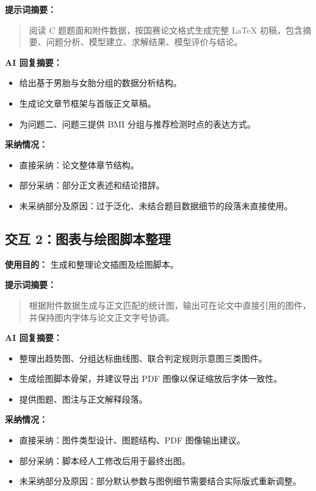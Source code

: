 \documentclass[12pt,a4paper]{article}
\begin{document}
\textbf{提示词摘要：}
\begin{quote}
阅读 C 题题面和附件数据，按国赛论文格式生成完整 \LaTeX{} 初稿，包含摘要、问题分析、模型建立、求解结果、模型评价与结论。
\end{quote}

\textbf{AI 回复摘要：}
\begin{itemize}
    \item 给出基于男胎与女胎分组的数据分析结构。
    \item 生成论文章节框架与首版正文草稿。
    \item 为问题二、问题三提供 BMI 分组与推荐检测时点的表达方式。
\end{itemize}

\textbf{采纳情况：}
\begin{itemize}
    \item 直接采纳：论文整体章节结构。
    \item 部分采纳：部分正文表述和结论措辞。
    \item 未采纳部分及原因：过于泛化、未结合题目数据细节的段落未直接使用。
\end{itemize}

\subsection*{交互 2：图表与绘图脚本整理}
\textbf{使用目的：} 生成和整理论文插图及绘图脚本。

\textbf{提示词摘要：}
\begin{quote}
根据附件数据生成与正文匹配的统计图，输出可在论文中直接引用的图件，并保持图内字体与论文正文字号协调。
\end{quote}

\textbf{AI 回复摘要：}
\begin{itemize}
    \item 整理出趋势图、分组达标曲线图、联合判定规则示意图三类图件。
    \item 生成绘图脚本骨架，并建议导出 PDF 图像以保证缩放后字体一致性。
    \item 提供图题、图注与正文解释段落。
\end{itemize}

\textbf{采纳情况：}
\begin{itemize}
    \item 直接采纳：图件类型设计、图题结构、PDF 图像输出建议。
    \item 部分采纳：脚本经人工修改后用于最终出图。
    \item 未采纳部分及原因：部分默认参数与图例细节需要结合实际版式重新调整。
\end{itemize}
\end{document}
